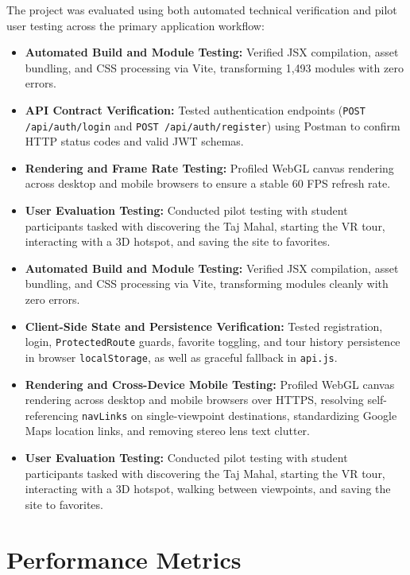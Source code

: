 \documentclass{tietreport}
\begin{document}
The project was evaluated using both automated technical verification and pilot user testing across the primary application workflow:

\begin{itemize}
  \item \textbf{Automated Build and Module Testing:} Verified JSX compilation, asset bundling, and CSS processing via Vite, transforming 1,493 modules with zero errors.
  \item \textbf{API Contract Verification:} Tested authentication endpoints (\texttt{POST /api/auth/login} and \texttt{POST /api/auth/register}) using Postman to confirm HTTP status codes and valid JWT schemas.
  \item \textbf{Rendering and Frame Rate Testing:} Profiled WebGL canvas rendering across desktop and mobile browsers to ensure a stable 60 FPS refresh rate.
  \item \textbf{User Evaluation Testing:} Conducted pilot testing with student participants tasked with discovering the Taj Mahal, starting the VR tour, interacting with a 3D hotspot, and saving the site to favorites.
  \item \textbf{Automated Build and Module Testing:} Verified JSX compilation, asset bundling, and CSS processing via Vite, transforming modules cleanly with zero errors.
  \item \textbf{Client-Side State and Persistence Verification:} Tested registration, login, \texttt{ProtectedRoute} guards, favorite toggling, and tour history persistence in browser \texttt{localStorage}, as well as graceful fallback in \texttt{api.js}.
  \item \textbf{Rendering and Cross-Device Mobile Testing:} Profiled WebGL canvas rendering across desktop and mobile browsers over HTTPS, resolving self-referencing \texttt{navLinks} on single-viewpoint destinations, standardizing Google Maps location links, and removing stereo lens text clutter.
  \item \textbf{User Evaluation Testing:} Conducted pilot testing with student participants tasked with discovering the Taj Mahal, starting the VR tour, interacting with a 3D hotspot, walking between viewpoints, and saving the site to favorites.
\end{itemize}

\section{Performance Metrics}
\end{document}
